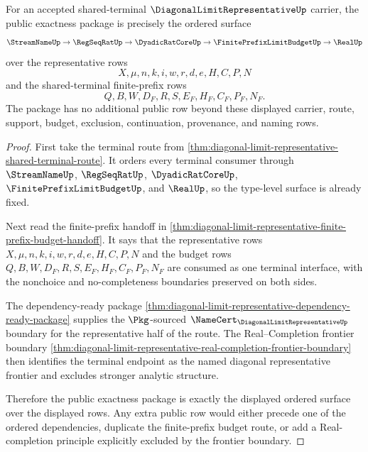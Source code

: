 \begin{theorem}
\label{thm:diagonal-limit-representative-public-exactness-package}
For an accepted shared-terminal $\DiagonalLimitRepresentativeUp$ carrier, the public exactness package is precisely the ordered surface
$$
\StreamNameUp \to \RegSeqRatUp \to \DyadicRatCoreUp \to \FinitePrefixLimitBudgetUp \to \RealUp
$$
over the representative rows
$$
X,\mu,n,k,i,w,r,d,e,H,C,P,N
$$
and the shared-terminal finite-prefix rows
$$
Q,B,W,D_F,R,S,E_F,H_F,C_F,P_F,N_F.
$$
The package has no additional public row beyond these displayed carrier, route, support, budget, exclusion, continuation, provenance, and naming rows.
\end{theorem}
\begin{proof}
First take the terminal route from \autoref{thm:diagonal-limit-representative-shared-terminal-route}. It orders every terminal consumer through $\StreamNameUp$, $\RegSeqRatUp$, $\DyadicRatCoreUp$, $\FinitePrefixLimitBudgetUp$, and $\RealUp$, so the type-level surface is already fixed.

Next read the finite-prefix handoff in \autoref{thm:diagonal-limit-representative-finite-prefix-budget-handoff}. It says that the representative rows $X,\mu,n,k,i,w,r,d,e,H,C,P,N$ and the budget rows $Q,B,W,D_F,R,S,E_F,H_F,C_F,P_F,N_F$ are consumed as one terminal interface, with the nonchoice and no-completeness boundaries preserved on both sides.

The dependency-ready package \autoref{thm:diagonal-limit-representative-dependency-ready-package} supplies the $\Pkg$-sourced $\NameCert_{\DiagonalLimitRepresentativeUp}$ boundary for the representative half of the route. The Real--Completion frontier boundary \autoref{thm:diagonal-limit-representative-real-completion-frontier-boundary} then identifies the terminal endpoint as the named diagonal representative frontier and excludes stronger analytic structure.

Therefore the public exactness package is exactly the displayed ordered surface over the displayed rows. Any extra public row would either precede one of the ordered dependencies, duplicate the finite-prefix budget route, or add a Real-completion principle explicitly excluded by the frontier boundary.
\end{proof}

